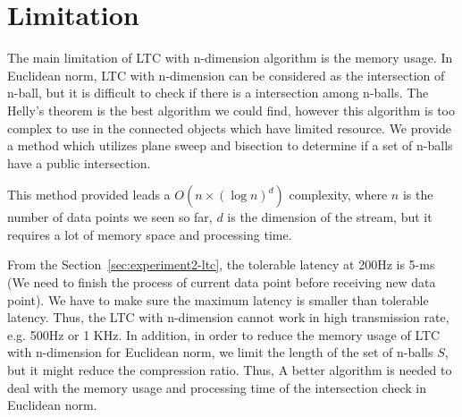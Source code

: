 






\section{Limitation}


The main limitation of LTC with n-dimension algorithm is the memory usage. In
Euclidean norm, LTC with n-dimension can be considered as the intersection of
n-ball, but it is difficult to check if there is a intersection among n-balls.
The Helly's theorem is the best algorithm we could find, however this algorithm
is too complex to use in the connected objects which have limited resource.  We
provide a method which utilizes plane sweep and bisection to determine if a set
of n-balls have a public intersection.

This method provided leads a $O(n\times (\log{n})^d)$ complexity, where $n$ is
the number of data points we seen so far, $d$ is the dimension of the stream,
but it requires a lot of memory space and processing time. 

From the Section~\ref{sec:experiment2-ltc}, the tolerable latency at 200Hz is
5-ms (We need to finish the process of current data point before receiving new
data point). We have to make sure the maximum latency is smaller than tolerable
latency. Thus, the LTC with n-dimension cannot work in high transmission rate,
e.g. 500Hz or 1 KHz.  In addition, in order to reduce the memory usage of LTC
with n-dimension for Euclidean norm, we limit the length of the set of n-balls
$S$, but it might reduce the compression ratio. Thus, A better algorithm is
needed to deal with the memory usage and processing time of the intersection
check in Euclidean norm.

